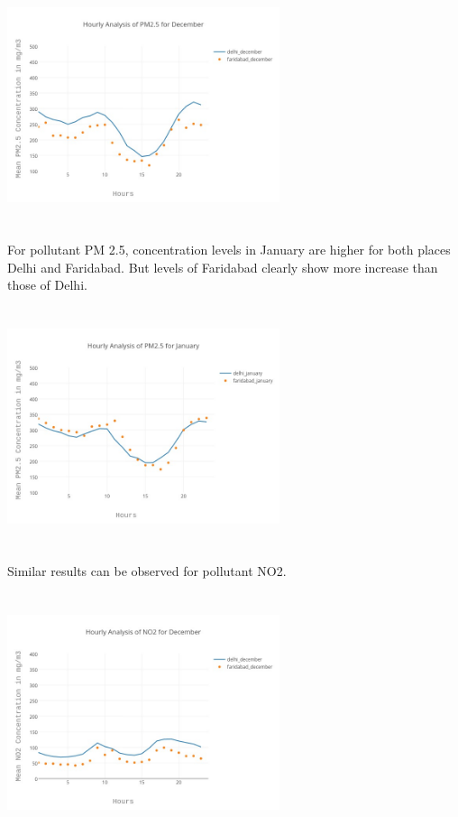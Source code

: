 \documentclass{report}
\begin{document}
\graphicspath{ {report/} }
\includegraphics[width=8cm, height=7cm]{Linechart_December_PM25}

For pollutant PM 2.5, concentration levels in January are higher for both places Delhi and Faridabad. But levels of Faridabad clearly show more increase than those of Delhi.

\graphicspath{ {report/} }
\includegraphics[width=8cm, height=7cm]{Linechart_January_PM25}

Similar results can be observed for pollutant NO2.

\graphicspath{ {report/} }
\includegraphics[width=8cm, height=7cm]{Linechart_December_NO2}
\end{document}
